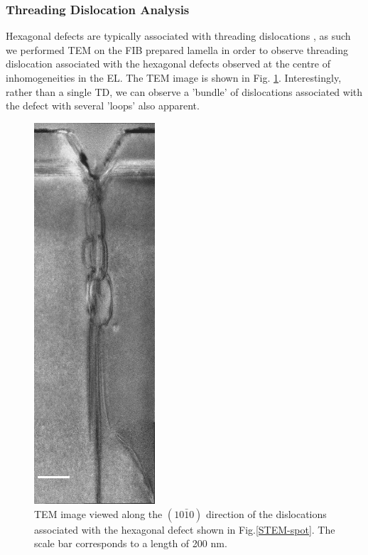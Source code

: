 \subsubsection{Threading Dislocation Analysis}

Hexagonal defects are typically associated with threading dislocations \cite{Florescu2003}, as such we performed TEM on the FIB prepared lamella in order to observe threading dislocation associated with the hexagonal defects observed at the centre of inhomogeneities in the EL. The TEM image is shown in Fig. \ref{TEM-spot}. Interestingly, rather than a single TD, we can observe a 'bundle' of dislocations associated with the defect with several 'loops' also apparent.

\begin{figure}[h]
	\centering
	\includegraphics[width=0.4\textwidth]{Figs/Ch3/TEMspot}
	\caption[h] {TEM image viewed along the $(10\bar{1}0)$ direction of the dislocations associated with the hexagonal defect shown in Fig.\ref{STEM-spot}. The scale bar corresponds to a  length of 200 nm.}
	\label{TEM-spot}
\end{figure}
\FloatBarrier 

